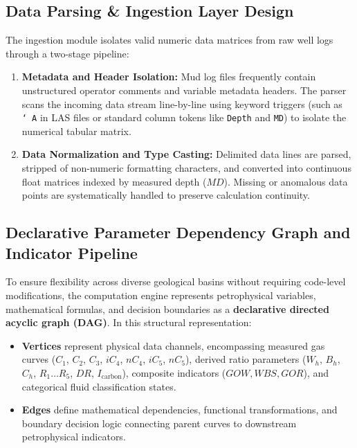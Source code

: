 \subsection{Data Parsing \& Ingestion Layer Design}

The ingestion module isolates valid numeric data matrices from raw well logs through a two-stage pipeline:

\begin{enumerate}
    \item \textbf{Metadata and Header Isolation:} Mud log files frequently contain unstructured operator comments and variable metadata headers. The parser scans the incoming data stream line-by-line using keyword triggers (such as \texttt{\char`~A} in LAS files or standard column tokens like \texttt{Depth} and \texttt{MD}) to isolate the numerical tabular matrix.
    \item \textbf{Data Normalization and Type Casting:} Delimited data lines are parsed, stripped of non-numeric formatting characters, and converted into continuous float matrices indexed by measured depth ($MD$). Missing or anomalous data points are systematically handled to preserve calculation continuity.
\end{enumerate}

\subsection{Declarative Parameter Dependency Graph and Indicator Pipeline}

To ensure flexibility across diverse geological basins without requiring code-level modifications, the computation engine represents petrophysical variables, mathematical formulas, and decision boundaries as a \textbf{declarative directed acyclic graph (DAG)}. In this structural representation:
\begin{itemize}
    \item \textbf{Vertices} represent physical data channels, encompassing measured gas curves ($C_1$, $C_2$, $C_3$, $iC_4$, $nC_4$, $iC_5$, $nC_5$), derived ratio parameters ($W_h$, $B_h$, $C_h$, $R_1 \dots R_5$, $DR$, $I_{\text{carbon}}$), composite indicators ($GOW, WBS, GOR$), and categorical fluid classification states.
    \item \textbf{Edges} define mathematical dependencies, functional transformations, and boundary decision logic connecting parent curves to downstream petrophysical indicators.
\end{itemize}

